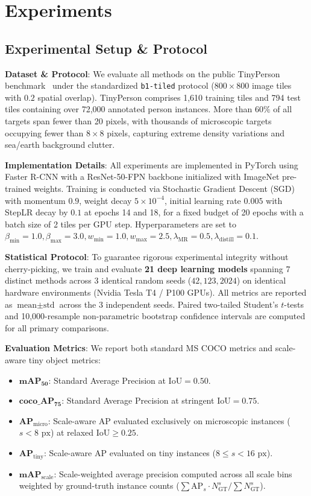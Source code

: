 \section{Experiments}
\label{sec:experiments}

\subsection{Experimental Setup \& Protocol}
\textbf{Dataset \& Protocol}: We evaluate all methods on the public TinyPerson benchmark~\cite{yu2020tinyperson} under the standardized \texttt{b1-tiled} protocol ($800\times 800$ image tiles with $0.2$ spatial overlap). TinyPerson comprises 1,610 training tiles and 794 test tiles containing over 72,000 annotated person instances. More than $60\%$ of all targets span fewer than 20 pixels, with thousands of microscopic targets occupying fewer than $8\times 8$ pixels, capturing extreme density variations and sea/earth background clutter.

\textbf{Implementation Details}: All experiments are implemented in PyTorch using Faster R-CNN with a ResNet-50-FPN backbone initialized with ImageNet pre-trained weights. Training is conducted via Stochastic Gradient Descent (SGD) with momentum $0.9$, weight decay $5\times 10^{-4}$, initial learning rate $0.005$ with StepLR decay by $0.1$ at epochs 14 and 18, for a fixed budget of 20 epochs with a batch size of 2 tiles per GPU step. Hyperparameters are set to $\beta_{\min} = 1.0, \beta_{\max} = 3.0, w_{\min} = 1.0, w_{\max} = 2.5, \lambda_{\mathrm{MR}} = 0.5, \lambda_{\mathrm{distill}} = 0.1$.

\textbf{Statistical Protocol}: To guarantee rigorous experimental integrity without cherry-picking, we train and evaluate \textbf{21 deep learning models} spanning 7 distinct methods across 3 identical random seeds ($42, 123, 2024$) on identical hardware environments (Nvidia Tesla T4 / P100 GPUs). All metrics are reported as $\text{mean} \pm \text{std}$ across the 3 independent seeds. Paired two-tailed Student's $t$-tests and 10,000-resample non-parametric bootstrap confidence intervals are computed for all primary comparisons.

\textbf{Evaluation Metrics}: We report both standard MS COCO metrics and scale-aware tiny object metrics:
\begin{itemize}
    \item $\mathbf{mAP_{50}}$: Standard Average Precision at $\mathrm{IoU} = 0.50$.
    \item $\mathbf{coco\_AP_{75}}$: Standard Average Precision at stringent $\mathrm{IoU} = 0.75$.
    \item $\mathbf{AP_{\mathrm{micro}}}$: Scale-aware AP evaluated exclusively on microscopic instances ($s < 8\text{ px}$) at relaxed $\mathrm{IoU} \ge 0.25$.
    \item $\mathbf{AP_{\mathrm{tiny}}}$: Scale-aware AP evaluated on tiny instances ($8 \le s < 16\text{ px}$).
    \item $\mathbf{mAP_{\mathrm{scale}}}$: Scale-weighted average precision computed across all scale bins weighted by ground-truth instance counts ($\sum \mathrm{AP}_s \cdot N_{\mathrm{GT}}^s / \sum N_{\mathrm{GT}}^s$).
\end{itemize}

